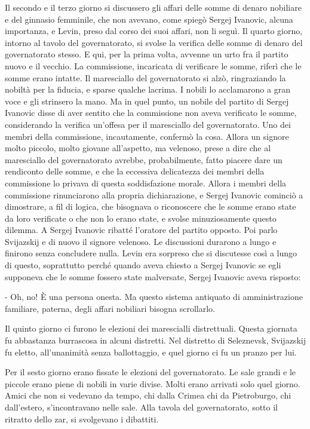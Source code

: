 Il secondo e il terzo giorno si discussero gli affari delle somme di denaro nobiliare e del ginnasio femminile, che non avevano, come spiegò Sergej Ivanovic, alcuna importanza, e Levin, preso dal corso dei suoi affari, non li seguì. Il quarto giorno, intorno al tavolo del governatorato, si svolse la verifica delle somme di denaro del governatorato stesso. E qui, per la prima volta, avvenne un urto fra il partito nuovo e il vecchio. La commissione, incaricata di verificare le somme, riferì che le somme erano intatte. Il maresciallo del governatorato si alzò, ringraziando la nobiltà per la fiducia, e sparse qualche lacrima. I nobili lo acclamarono a gran voce e gli strinsero la mano. Ma in quel punto, un nobile del partito di Sergej Ivanovic disse di aver sentito che la commissione non aveva verificato le somme, considerando la verifica un'offesa per il maresciallo del governatorato. Uno dei membri della commissione, incautamente, confermò la cosa. Allora un signore molto piccolo, molto giovane all'aspetto, ma velenoso, prese a dire che al maresciallo del governatorato avrebbe, probabilmente, fatto piacere dare un rendiconto delle somme, e che la eccessiva delicatezza dei membri della commissione lo privava di questa soddisfazione morale. Allora i membri della commissione rinunciarono alla propria dichiarazione, e Sergej Ivanovic cominciò a dimostrare, a fil di logica, che bisognava o riconoscere che le somme erano state da loro verificate o che non lo erano state, e svolse minuziosamente questo dilemma. A Sergej Ivanovic ribatté l'oratore del partito opposto. Poi parlo Svijazskij e di nuovo il signore velenoso. Le discussioni durarono a lungo e finirono senza concludere nulla. Levin era sorpreso che si discutesse così a lungo di questo, soprattutto perché quando aveva chiesto a Sergej Ivanovic se egli supponeva che le somme fossero state malversate, Sergej Ivanovic aveva risposto: 

- Oh, no! È una persona onesta. Ma questo sistema antiquato di amministrazione familiare, paterna, degli affari nobiliari bisogna scrollarlo. 

Il quinto giorno ci furono le elezioni dei marescialli distrettuali. Questa giornata fu abbastanza burrascosa in alcuni distretti. Nel distretto di Seleznevsk, Svijazskij fu eletto, all'unanimità senza ballottaggio, e quel giorno ci fu un pranzo per lui. 

Per il sesto giorno erano fissate le elezioni del governatorato. Le sale grandi e le piccole erano piene di nobili in varie divise. Molti erano arrivati solo quel giorno. Amici che non si vedevano da tempo, chi dalla Crimea chi da Pietroburgo, chi dall'estero, s'incontravano nelle sale. Alla tavola del governatorato, sotto il ritratto dello zar, si svolgevano i dibattiti. 

